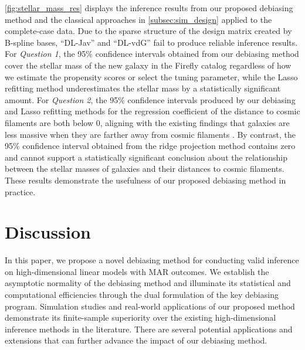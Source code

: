 \documentclass[ejsv2,noshowframe]{imsart}
\theoremstyle{plain}
\theoremstyle{definition}
\theoremstyle{remark}
\begin{document}
\autoref{fig:stellar_mass_res} displays the inference results from our proposed debiasing method and the classical approaches in \autoref{subsec:sim_design} applied to the complete-case data. Due to the sparse structure of the design matrix created by B-spline bases, ``DL-Jav'' and ``DL-vdG'' fail to produce reliable inference results. For \emph{Question 1}, the 95\% confidence intervals obtained from our debiasing method cover the stellar mass of the new galaxy in the Firefly catalog regardless of how we estimate the propensity scores or select the tuning parameter, while the Lasso refitting method underestimates the stellar mass by a statistically significant amount. For \emph{Question 2}, the 95\% confidence intervals produced by our debiasing and Lasso refitting methods for the regression coefficient of the distance to cosmic filaments are both below 0, aligning with the existing findings that galaxies are less massive when they are farther away from cosmic filaments \citep{alpaslan2016galaxy,kraljic2018galaxy,malavasi2022relative}. By contrast, the 95\% confidence interval obtained from the ridge projection method contains zero and cannot support a statistically significant conclusion about the relationship between the stellar masses of galaxies and their distances to cosmic filaments. These results demonstrate the usefulness of our proposed debiasing method in practice. 


\section{Discussion}
\label{sec:conclusion}

In this paper, we propose a novel debiasing method for conducting valid inference on high-dimensional linear models with MAR outcomes. We establish the asymptotic normality of the debiasing method and illuminate its statistical and computational efficiencies through the dual formulation of the key debiasing program. Simulation studies and real-world applications of our proposed method demonstrate its finite-sample superiority over the existing high-dimensional inference methods in the literature. There are several potential applications and extensions that can further advance the impact of our debiasing method.
\end{document}
